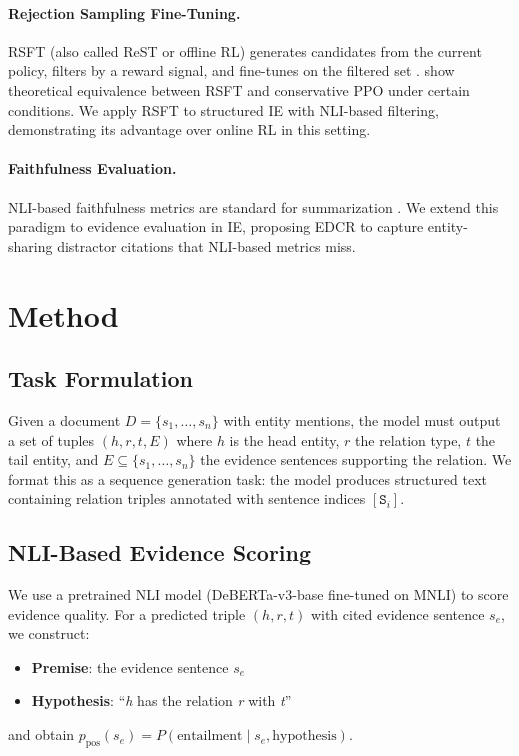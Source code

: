 \documentclass[11pt,a4paper]{article}
\begin{document}
\paragraph{Rejection Sampling Fine-Tuning.}
RSFT (also called ReST or offline RL) generates candidates from the current policy, filters by a reward signal, and fine-tunes on the filtered set \citep{yuan2023rrhf,dong2023raft,singh2024beyond}.
\citet{tajwar2024preference} show theoretical equivalence between RSFT and conservative PPO under certain conditions.
We apply RSFT to structured IE with NLI-based filtering, demonstrating its advantage over online RL in this setting.

\paragraph{Faithfulness Evaluation.}
NLI-based faithfulness metrics are standard for summarization \citep{laban2022summac,honovich2022true}.
We extend this paradigm to evidence evaluation in IE, proposing EDCR to capture entity-sharing distractor citations that NLI-based metrics miss.

\section{Method}
\label{sec:method}

\subsection{Task Formulation}

Given a document $D = \{s_1, \ldots, s_n\}$ with entity mentions, the model must output a set of tuples $(h, r, t, E)$ where $h$ is the head entity, $r$ the relation type, $t$ the tail entity, and $E \subseteq \{s_1, \ldots, s_n\}$ the evidence sentences supporting the relation.
We format this as a sequence generation task: the model produces structured text containing relation triples annotated with sentence indices $[\texttt{S}_i]$.

\subsection{NLI-Based Evidence Scoring}
\label{sec:ced}

We use a pretrained NLI model (DeBERTa-v3-base fine-tuned on MNLI) to score evidence quality.
For a predicted triple $(h, r, t)$ with cited evidence sentence $s_e$, we construct:
\begin{itemize}
    \item \textbf{Premise}: the evidence sentence $s_e$
    \item \textbf{Hypothesis}: ``\textit{h} has the relation \textit{r} with \textit{t}''
\end{itemize}
and obtain $p_{\text{pos}}(s_e) = P(\text{entailment} \mid s_e, \text{hypothesis})$.
\end{document}
